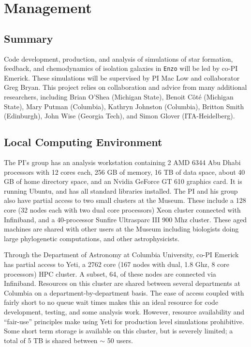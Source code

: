 \documentclass[11pt]{article}
\begin{document}
\section{Management}

\subsection{Summary}

Code development, production, and analysis of simulations of star formation, feedback, and chemodynamics of isolation galaxies in \texttt{Enzo} will be led by co-PI Emerick. These simulations will be supervised by PI Mac Low and collaborator Greg Bryan. This project relies on collaboration and advice from many additional researchers, including Brian O'Shea (Michigan State), Benoit C{\^o}t{\'e} (Michigan State), Mary Putman (Columbia), Kathryn Johnston (Columbia), Britton Smith (Edinburgh), John Wise (Georgia Tech), and Simon Glover (ITA-Heidelberg).

\subsection{Local Computing Environment}

The PI's group has an analysis workstation containing  2 AMD 6344 Abu Dhabi processors with 12 cores each, 256 GB of memory, 16 TB of data space, about 40 GB of home directory space, and an Nvidia GeForce GT 610 graphics card. It is running Ubuntu, and has all standard libraries installed.  The PI and his group also have partial access to two small clusters at the Museum. These include a 128 core (32 nodes each with two dual core processors) Xeon cluster connected with Infiniband, and a 40-processor Sunfire Ultrasparc III 900 Mhz cluster. These aged machines are shared with other users at the Museum including biologists doing large phylogenetic computations, and other astrophysicists.

Through the Department of Astronomy at Columbia University, co-PI Emerick has partial access to Yeti, a 2762 core (167 nodes with dual, 1.8 Ghz, 8 core processors) HPC cluster. A subset, 64, of these nodes are connected via Infiniband. Resources on this cluster are shared between several departments at Columbia on a department-by-department basis. The ease of access coupled with fairly short to no queue wait times makes this an ideal resource for code development, testing, and some analysis work. However, resource availability and ``fair-use'' principles make using Yeti for production level simulations prohibitive. Some short term storage is available on this cluster, but is severely limited; a total of 5 TB is shared between $\sim$ 50 users.
\end{document}
